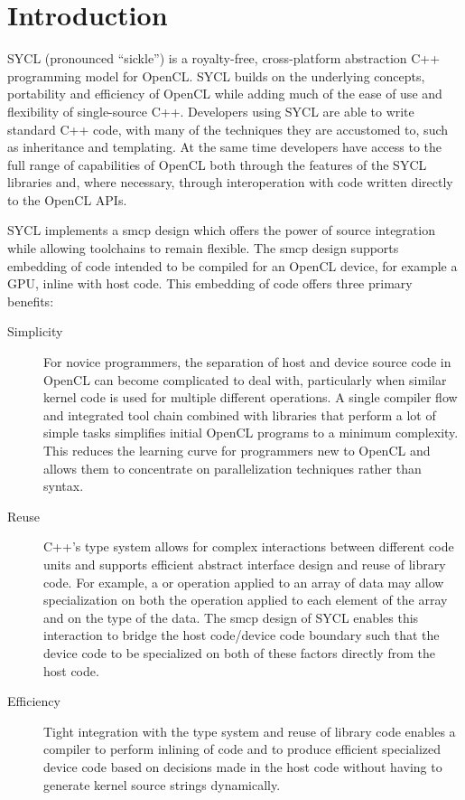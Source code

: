 %


\chapter{Introduction}

SYCL (pronounced ``sickle'') is a
royalty-free, cross-platform abstraction C++ programming model for
OpenCL. SYCL builds on the underlying concepts, portability and
efficiency of OpenCL while adding much of the ease of use and
flexibility of single-source C++.
Developers using SYCL are able to write standard
C++ code, with many of the techniques they are accustomed to, such as
inheritance and templating. At the same time developers have access to
the full range of capabilities of OpenCL both through the features of
the SYCL libraries and, where necessary, through interoperation with
code written directly to the OpenCL APIs.

SYCL implements a \gls{smcp}  design which offers the power of source
integration while allowing toolchains to remain flexible. The \gls{smcp}
design supports embedding of code intended to be compiled for an OpenCL device,
for example a GPU, inline with host code. This embedding of code offers three
primary benefits:
\begin{description}
\item[Simplicity]
  For novice programmers, the separation of host and device source code in
  OpenCL can become complicated to deal with, particularly when similar kernel
  code is used for multiple different operations. A single compiler flow and
  integrated tool chain combined with libraries that perform a lot of simple
  tasks simplifies initial OpenCL programs to a minimum complexity. This reduces
  the learning curve for programmers new to OpenCL and allows them to
  concentrate on parallelization techniques rather than syntax.
\item[Reuse]
  C++'s type system allows for complex interactions between different code units
  and supports efficient abstract interface design and reuse of library code.
  For example, a  or  operation applied to an
  array of data may allow specialization on both the operation applied to each
  element of the array and on the type of the data. The \gls{smcp} design of
  SYCL enables this interaction to bridge the host code/device code boundary
  such that the device code to be specialized on both of these factors directly
  from the host code.
\item[Efficiency]
  Tight integration with the type system and reuse of library code enables a
  compiler to perform inlining of code and to produce efficient specialized
  device code based on decisions made in the host code without having to
  generate kernel source strings dynamically.
\end{description}

